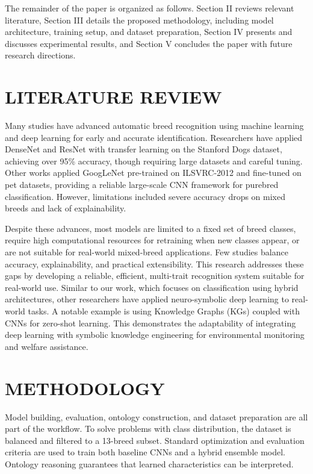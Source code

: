 \documentclass[conference]{IEEEtran}
\begin{document}
The remainder of the paper is organized as follows. Section II reviews relevant literature, Section III details the proposed methodology, including model architecture, training setup, and dataset preparation, Section IV presents and discusses experimental results, and Section V concludes the paper with future research directions.

\section{LITERATURE REVIEW}
Many studies have advanced automatic breed recognition using machine learning and deep learning for early and accurate identification. Researchers have applied DenseNet and ResNet with transfer learning on the Stanford Dogs dataset, achieving over 95\% accuracy, though requiring large datasets and careful tuning. Other works applied GoogLeNet pre-trained on ILSVRC-2012 and fine-tuned on pet datasets, providing a reliable large-scale CNN framework for purebred classification. However, limitations included severe accuracy drops on mixed breeds and lack of explainability.

Despite these advances, most models are limited to a fixed set of breed classes, require high computational resources for retraining when new classes appear, or are not suitable for real-world mixed-breed applications. Few studies balance accuracy, explainability, and practical extensibility. This research addresses these gaps by developing a reliable, efficient, multi-trait recognition system suitable for real-world use. Similar to our work, which focuses on classification using hybrid architectures, other researchers have applied neuro-symbolic deep learning to real-world tasks. A notable example is using Knowledge Graphs (KGs) coupled with CNNs for zero-shot learning. This demonstrates the adaptability of integrating deep learning with symbolic knowledge engineering for environmental monitoring and welfare assistance.

\section{METHODOLOGY}
Model building, evaluation, ontology construction, and dataset preparation are all part of the workflow. To solve problems with class distribution, the dataset is balanced and filtered to a 13-breed subset. Standard optimization and evaluation criteria are used to train both baseline CNNs and a hybrid ensemble model. Ontology reasoning guarantees that learned characteristics can be interpreted. 
\end{document}
